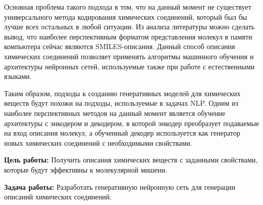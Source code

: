 \documentclass[a4paper,14pt]{extreport}
\begin{document}
Основная проблема такого подхода в том, что на данный момент не существует универсального метода кодирования химических соединений, который был бы лучше всех остальных в любой ситуации. Из анализа литературы можно сделать вывод, что наиболее перспективным форматом представления молекул в памяти компьютера сейчас являются SMILES-описания. Данный способ описания химических соединений позволяет применять алгоритмы машинного обучения и архитектуры нейронных сетей, используемые также при работе с естественными языками.

Таким образом, подходы к созданию генеративных моделей для химических веществ будут похожи на подходы, используемые в задачах NLP. Одним из наиболее перспективных методов на данный момент является обучение архитектуры с энкодером и декодером, в которой энкодер преобразует подаваемые на вход описания молекул, а обученный декодер используется как генератор новых химических соединений с необходимыми свойствами.


\textbf{Цель работы:} Получить описания химических веществ с заданными свойствами, которые будут эффективны к молекулярной мишени.

\textbf{Задача работы:} Разработать генеративную нейронную сеть для генерации описаний химических соединений.


  
  
\end{document}
